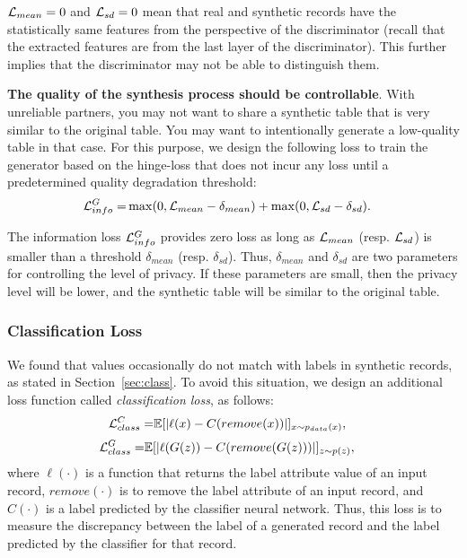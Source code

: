 $\mathcal{L}_{mean}=0$ and $\mathcal{L}_{sd}=0$ mean that real and synthetic records  have the statistically same features from the perspective of the discriminator (recall that the extracted features are from the last layer of the discriminator). This further implies that the discriminator may not be able to distinguish them.

\textbf{The quality of the synthesis process should be controllable}. With unreliable partners, you may not want to share a synthetic table that is very similar to the original table. You may want to intentionally generate a low-quality table in that case. For this purpose, we design the following loss to train the generator based on the hinge-loss that does not incur any loss until a predetermined quality degradation threshold:
\begin{equation}\begin{aligned}
\mathcal{L}_{info}^{G} =  & \max(0, \mathcal{L}_{mean}-\delta_{mean}) + \max(0, \mathcal{L}_{sd}-\delta_{sd}).
\end{aligned}\end{equation}

The information loss $\mathcal{L}_{info}^G$ provides zero loss as long as $\mathcal{L}_{mean}$ (resp. $\mathcal{L}_{sd}$) is smaller than a threshold $\delta_{mean}$ (resp. $\delta_{sd}$). Thus, $\delta_{mean}$ and $\delta_{sd}$ are two parameters for controlling the level of privacy. If these parameters are small, then the privacy level will be lower, and the synthetic table will be similar to the original table.

\subsubsection{Classification Loss}
We found that  values occasionally do not match with labels in synthetic records, as stated in Section~\ref{sec:class}. To avoid this situation, we design an additional loss function called \textit{classification loss}, as follows:
\begin{equation}\label{eq:class}\begin{aligned}
\mathcal{L}_{class}^{C} =  & \mathbb{E}[|\ell(x)-C(remove(x))|]_{x \sim p_{data}(x)},
\end{aligned}\end{equation}
\begin{equation}\begin{aligned}
\mathcal{L}_{class}^{G} = &\mathbb{E}[|\ell(G(z))-C(remove(G(z)))
|]_{z \sim p(z)},
\end{aligned}\end{equation}
where $\ell(\cdot)$ is a function that returns the label attribute value of an input record, $remove(\cdot)$ is to remove the label attribute of an input record, and $C(\cdot)$ is a label predicted by the classifier neural network. Thus, this loss is to measure the discrepancy between the label of a generated record and the label predicted by the classifier for that record.

